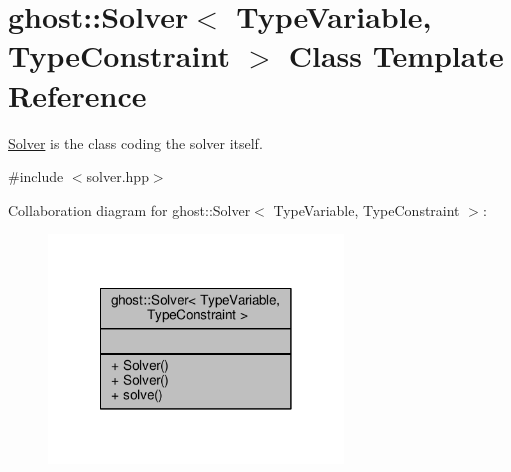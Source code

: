 \hypertarget{classghost_1_1Solver}{\section{ghost\-:\-:Solver$<$ Type\-Variable, Type\-Constraint $>$ Class Template Reference}
\label{classghost_1_1Solver}
}


\hyperlink{classghost_1_1Solver}{Solver} is the class coding the solver itself.  




{\ttfamily \#include $<$solver.\-hpp$>$}



Collaboration diagram for ghost\-:\-:Solver$<$ Type\-Variable, Type\-Constraint $>$\-:
\nopagebreak
\begin{figure}[H]
\begin{center}
\leavevmode
\includegraphics[width=222pt]{classghost_1_1Solver__coll__graph}
\end{center}
\end{figure}
